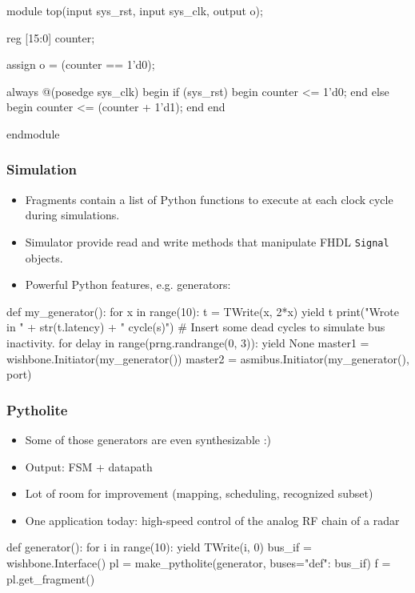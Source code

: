 \documentclass[serif,mathserif]{beamer}
\begin{document}
\begin{frame}[fragile]
\begin{verbatimtab}
module top(input sys_rst, input sys_clk, output o);

reg [15:0] counter;

assign o = (counter == 1'd0);

always @(posedge sys_clk) begin
        if (sys_rst) begin
                counter <= 1'd0;
        end else begin
                counter <= (counter + 1'd1);
        end
end

endmodule
\end{verbatimtab}
\end{frame}

\begin{frame}[fragile]
\frametitle{Simulation}
\begin{itemize}
\item Fragments contain a list of Python functions to execute at each clock cycle during simulations.
\item Simulator provide read and write methods that manipulate FHDL \verb!Signal! objects.
\item Powerful Python features, e.g. generators:
\end{itemize}
\begin{verbatimtab}
def my_generator():
        for x in range(10):
                t = TWrite(x, 2*x)
                yield t
                print("Wrote in " + str(t.latency) + " cycle(s)")
                # Insert some dead cycles to simulate bus inactivity.
                for delay in range(prng.randrange(0, 3)):
                        yield None
master1 = wishbone.Initiator(my_generator())
master2 = asmibus.Initiator(my_generator(), port)
\end{verbatimtab}
\end{frame}

\begin{frame}[fragile]
\frametitle{Pytholite}
\begin{itemize}
\item Some of those generators are even synthesizable :)
\item Output: FSM + datapath
\item Lot of room for improvement (mapping, scheduling, recognized subset)
\item One application today: high-speed control of the analog RF chain of a radar
\end{itemize}
\begin{verbatimtab}
def generator():
        for i in range(10):
                yield TWrite(i, 0)
bus_if = wishbone.Interface()
pl = make_pytholite(generator,
        buses={"def": bus_if})
f = pl.get_fragment()
\end{verbatimtab}
\end{frame}
\end{document}
